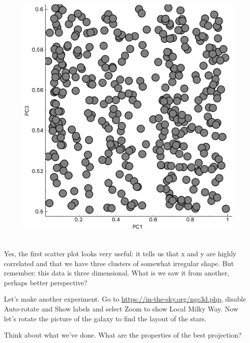 \begin{figure}[h]
    \hspace{0.5cm}
    \includegraphics[scale=0.25]{pca3.png}
    \caption{$\;$}
\end{figure}

Yes, the first scatter plot looks very useful: it tells us that x and y are highly correlated and that we have three clusters of somewhat irregular shape. But remember: this data is three dimensional. What is we saw it from another, perhaps better perspective?

Let's make another experiment. Go to \url{https://in-the-sky.org/ngc3d.php}, disable Auto-rotate and Show labels and select Zoom to show Local Milky Way. Now let's rotate the picture of the galaxy to find the layout of the stars.

Think about what we've done. What are the properties of the best projection?

